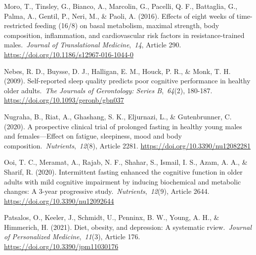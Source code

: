 \documentclass[authordate, empirical]{jote-new-article}
\begin{document}



Moro, T., Tinsley, G., Bianco, A., Marcolin, G., Pacelli, Q. F., Battaglia, G., Palma, A., Gentil, P., Neri, M., \& Paoli, A. (2016). Effects of eight weeks of time-restricted feeding (16/8) on basal metabolism, maximal strength, body composition, inflammation, and cardiovascular risk factors in resistance-trained males. \emph{Journal of Translational Medicine}, \emph{14}, Article 290. \url{https://doi.org/10.1186/s12967-016-1044-0}



Nebes, R. D., Buysse, D. J., Halligan, E. M., Houck, P. R., \& Monk, T. H. (2009). Self-reported sleep quality predicts poor cognitive performance in healthy older adults. \emph{The Journals of Gerontology: Series B}, \emph{64}(2), 180-187. \url{https://doi.org/10.1093/geronb/gbn037}



Nugraha, B., Riat, A., Ghashang, S. K., Eljurnazi, L., \& Gutenbrunner, C. (2020). A prospective clinical trial of prolonged fasting in healthy young males and females—Effect on fatigue, sleepiness, mood and body composition. \emph{Nutrients}, \emph{12}(8), Article 2281. \url{https://doi.org/10.3390/nu12082281}



Ooi, T. C., Meramat, A., Rajab, N. F., Shahar, S., Ismail, I. S., Azam, A. A., \& Sharif, R. (2020). Intermittent fasting enhanced the cognitive function in older adults with mild cognitive impairment by inducing biochemical and metabolic changes: A 3-year progressive study. \emph{Nutrients}, \emph{12}(9), Article 2644. \url{https://doi.org/10.3390/nu12092644}






Patsalos, O., Keeler, J., Schmidt, U., Penninx, B. W., Young, A. H., \& Himmerich, H. (2021). Diet, obesity, and depression: A systematic rview. \emph{Journal of Personalized Medicine}, \emph{11}(3), Article 176. \href{https://doi.org/10.3390/jpm11030176}{https://doi.org/10.3390/jpm11030176}
\end{document}

